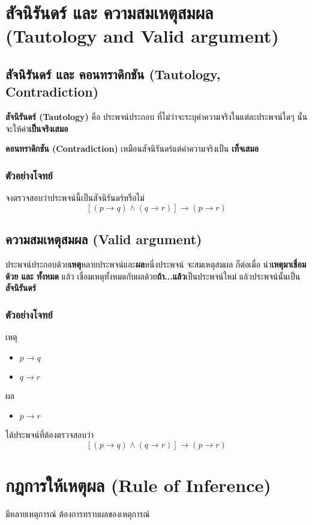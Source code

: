 \documentclass[12pt,a4paper]{article}
\begin{document}
\section*{สัจนิรันดร์ และ ความสมเหตุสมผล (Tautology and Valid argument)}
\subsection*{สัจนิรันดร์ และ คอนทราดิกชัน (Tautology, Contradiction)}
\quad \textbf{สัจนิรันดร์ (Tautology)} คือ ประพจน์ประกอบ ที่ไม่ว่าจะระบุค่าความจริงในแต่ละประพจน์ใดๆ นั้นจะให้ค่า\textbf{เป็นจริงเสมอ}\par
\textbf{คอนทราดิกชัน (Contradiction)} เหมือนสัจนิรันดร์แต่ค่าความจริงเป็น \textbf{เท็จเสมอ}
\subsubsection*{ตัวอย่างโจทย์}
จงตรวจสอบว่าประพจน์นี้เป็นสัจนิรันดร์หรือไม่
$$
    \left[ (p \rightarrow q) \land (q \rightarrow r) \right] \rightarrow (p \rightarrow r)
$$
\rule{0pt}{35ex}
\subsection*{ความสมเหตุสมผล (Valid argument)}
\quad ประพจน์ประกอบด้วย\textbf{เหตุ}หลายประพจน์และ\textbf{ผล}หนึ่งประพจน์ จะสมเหตุสมผล ก็ต่อเมื่อ นำ\textbf{เหตุมาเชื่อมด้วย และ ทั้งหมด} แล้ว เชื่อมเหตุทั้งหมดกับผลด้วย\textbf{ถ้า...แล้ว}เป็นประพจน์ใหม่ แล้วประพจน์นั้นเป็น \textbf{สัจนิรันดร์}

\subsubsection*{ตัวอย่างโจทย์}
เหตุ
\begin{itemize}
    \item $p \rightarrow q$
    \item $q \rightarrow r$
\end{itemize}
ผล
\begin{itemize}
    \item $p \rightarrow r$
\end{itemize}
ได้ประพจน์ที่ต้องตรวจสอบว่า
$$
    \left[ (p \rightarrow q) \land (q \rightarrow r) \right] \rightarrow (p \rightarrow r)
$$
\hrulefill

\newpage
\section*{กฎการให้เหตุผล (Rule of Inference)}
มีหลายเหตุการณ์ ต้องการทราบผลของเหตุการณ์
\end{document}
